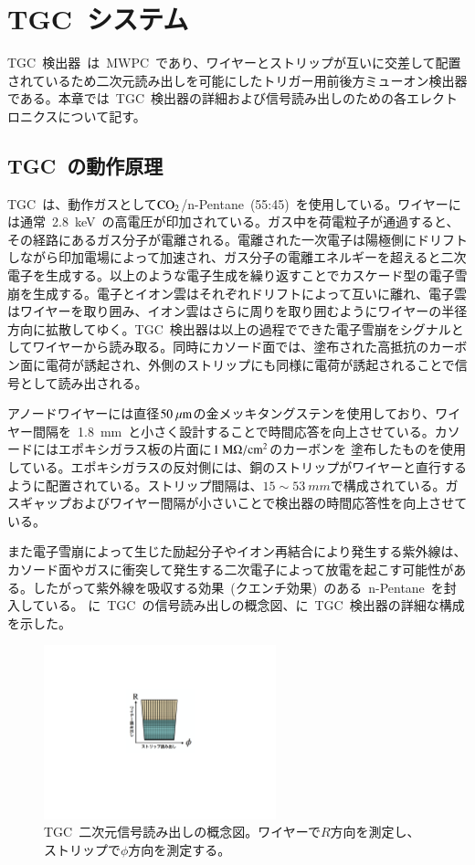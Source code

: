 \chapter{TGC~システム}
\thispagestyle{empty}
\label{chap:4}
TGC~検出器~\cite{TR:04}は~MWPC~であり、ワイヤーとストリップが互いに交差して配置されているため二次元読み出しを可能にしたトリガー用前後方ミューオン検出器である。本章では~TGC~検出器の詳細および信号読み出しのための各エレクトロニクスについて記す。
\section{TGC~の動作原理}
TGC~は、動作ガスとして$\rm{CO_2}$/n-Pentane~(55:45)~を使用している。ワイヤーには通常~2.8~keV~の高電圧が印加されている。ガス中を荷電粒子が通過すると、その経路にあるガス分子が電離される。電離された一次電子は陽極側にドリフトしながら印加電場によって加速され、ガス分子の電離エネルギーを超えると二次電子を生成する。以上のような電子生成を繰り返すことでカスケード型の電子雪崩を生成する。電子とイオン雲はそれぞれドリフトによって互いに離れ、電子雲はワイヤーを取り囲み、イオン雲はさらに周りを取り囲むようにワイヤーの半径方向に拡散してゆく。TGC~検出器は以上の過程でできた電子雪崩をシグナルとしてワイヤーから読み取る。同時にカソード面では、塗布された高抵抗のカーボン面に電荷が誘起され、外側のストリップにも同様に電荷が誘起されることで信号として読み出される。

アノードワイヤーには直径$50~\mu\rm{m}$の金メッキタングステンを使用しており、ワイヤー間隔を~1.8~mm~と小さく設計することで時間応答を向上させている。カソードにはエポキシガラス板の片面に$\rm{1}~\rm{M}\Omega/\rm{cm}^2$のカーボンを
塗布したものを使用している。エポキシガラスの反対側には、銅のストリップがワイヤーと直行するように配置されている。ストリップ間隔は、$15\sim53~mm$で構成されている。ガスギャップおよびワイヤー間隔が小さいことで検出器の時間応答性を向上させている。

また電子雪崩によって生じた励起分子やイオン再結合により発生する紫外線は、カソード面やガスに衝突して発生する二次電子によって放電を起こす可能性がある。したがって紫外線を吸収する効果~(クエンチ効果)~のある~n-Pentane~を封入している。
に~TGC~の信号読み出しの概念図、に~TGC~検出器の詳細な構成を示した。

\begin{figure}[H]
        \centering   
        \includegraphics[width=0.6\textwidth,page=1]{img/pdf/tgc2d.pdf}
        \caption[TGC~二次元信号読み出しの概念図]{TGC~二次元信号読み出しの概念図。ワイヤーで$R$方向を測定し、ストリップで$\phi$方向を測定する。}\label{fig:tgc2d}
\end{figure}

